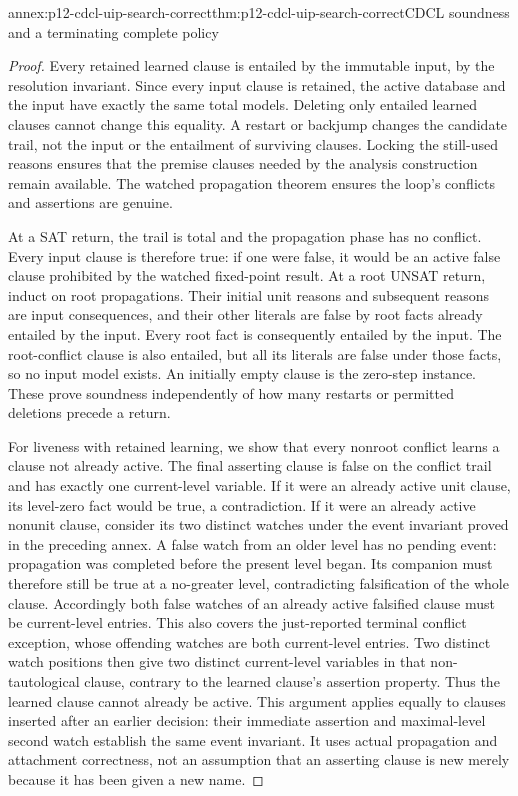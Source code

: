 \begin{annexitem}{annex:p12-cdcl-uip-search-correct}{thm:p12-cdcl-uip-search-correct}{CDCL soundness and a terminating complete policy}
\begin{proof}
Every retained learned clause is entailed by the immutable input, by the
resolution invariant.  Since every input clause is retained, the active
database and the input have exactly the same total models.  Deleting only
entailed learned clauses cannot change this equality.  A restart or backjump
changes the candidate trail, not the input or the entailment of surviving
clauses.  Locking the still-used reasons ensures that the premise clauses
needed by the analysis construction remain available.  The watched
propagation theorem ensures the loop's conflicts and assertions are genuine.

At a SAT return, the trail is total and the propagation phase has no conflict.
Every input clause is therefore true: if one were false, it would be an active
false clause prohibited by the watched fixed-point result.  At a root UNSAT
return, induct on root propagations.  Their initial unit reasons and subsequent
reasons are input consequences, and their other literals are false by root
facts already entailed by the input.  Every root fact is consequently entailed
by the input.  The root-conflict clause is also entailed, but all its literals
are false under those facts, so no input model exists.  An initially empty
clause is the zero-step instance.  These prove soundness independently of
how many restarts or permitted deletions precede a return.

For liveness with retained learning, we show that every nonroot conflict
learns a clause not already active.  The final asserting clause is false on
the conflict trail and has exactly one current-level variable.  If it were an
already active unit clause, its level-zero fact would be true, a contradiction.
If it were an already active nonunit clause, consider its two distinct
watches under the event invariant proved in the preceding annex.  A false
watch from an older level has no pending event: propagation was completed
before the present level began.  Its companion must therefore still be true
at a no-greater level, contradicting falsification of the whole clause.
Accordingly both false watches of an already active falsified clause must
be current-level entries.  This also covers the just-reported terminal
conflict exception, whose offending watches are both current-level entries.
Two distinct watch positions then give two distinct current-level variables
in that non-tautological clause, contrary to the learned clause's assertion
property.  Thus the learned clause cannot already be active.  This argument
applies equally to clauses inserted after an earlier decision: their immediate
assertion and maximal-level second watch establish the same event invariant.
It uses actual propagation and attachment correctness, not an assumption
that an asserting clause is new merely because it has been given a new name.


\end{proof}
\end{annexitem}
